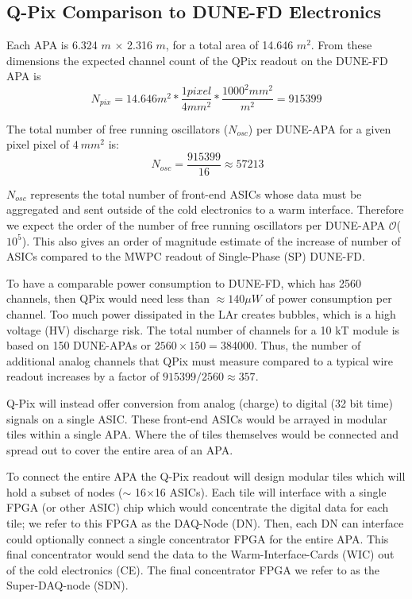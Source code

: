 \subsection{Q-Pix Comparison to DUNE-FD Electronics}

Each APA is 6.324 $\unit{m}$ $\times$ 2.316 $\unit{m}$, for a total area of 14.646 $\unit{m^{2}}$.
From these dimensions the expected channel count of the QPix readout on the DUNE-FD APA is
\begin{equation}
  N_{pix} = 14.646 m^{2} * \frac{1 pixel}{4 mm^{2}} * \frac{ 1000^{2} mm^{2} }{m^{2}} = 915399
\end{equation}

The total number of free running oscillators ($N_{osc}$) per DUNE-APA for a given pixel pixel of $4~mm^{2}$ is:
\begin{equation}~\label{eq:nosc}
N_{osc} = \frac{915399}{16} \approx 57213
\end{equation}

$N_{osc}$ represents the total number of front-end ASICs whose data must be aggregated and sent outside of the cold electronics to a warm interface.
Therefore we expect the order of the number of free running oscillators per DUNE-APA $\mathcal{O}$($10^5$).
This also gives an order of magnitude estimate of the increase of number of ASICs compared to the MWPC readout of Single-Phase (SP) DUNE-FD.

To have a comparable power consumption to DUNE-FD, which has 2560 channels, then QPix would need less than $\approx 140 \mu W$ of power consumption per channel.
Too much power dissipated in the LAr creates bubbles, which is a high voltage (HV) discharge risk.
The total number of channels for a 10 kT module is based on 150 DUNE-APAs or $2560\times 150 = $384000.
Thus, the number of additional analog channels that QPix must measure compared to a typical wire readout increases by a factor of $915399 / 2560 \approx 357$.

Q-Pix will instead offer conversion from analog (charge) to digital (32 bit time) signals on a single ASIC.
These front-end ASICs would be arrayed in modular tiles within a single APA.
Where the of tiles themselves would be connected and spread out to cover the entire area of an APA.

To connect the entire APA the Q-Pix readout will design modular tiles which will hold a subset of nodes ($\sim$ 16$\times$16 ASICs).
Each tile will interface with a single FPGA (or other ASIC) chip which would concentrate the digital data for each tile; we refer to this FPGA as the DAQ-Node (DN).
Then, each DN can interface could optionally connect a single concentrator FPGA for the entire APA.
This final concentrator would send the data to the Warm-Interface-Cards (WIC) out of the cold electronics (CE).
The final concentrator FPGA we refer to as the Super-DAQ-node (SDN).

